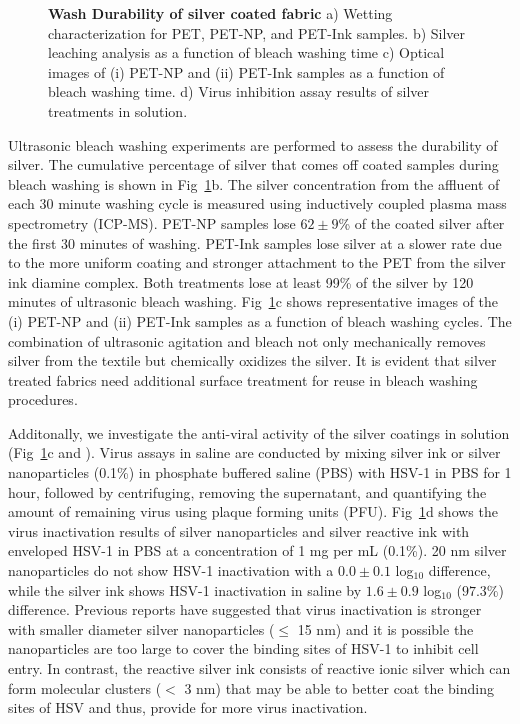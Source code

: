 \documentclass[10pt,letterpaper]{article}
\begin{document}
\begin{figure}[!h]
\caption{{\bf Wash Durability of silver coated fabric}{
a) Wetting characterization for PET, PET-NP, and PET-Ink samples. b) Silver leaching analysis as a function of bleach washing time c) Optical images of (i) PET-NP and (ii) PET-Ink samples as a function of bleach washing time. d) Virus inhibition assay results of silver treatments in solution.}}
\label{fig2}
\end{figure}

Ultrasonic bleach washing experiments are performed to assess the durability of silver.  
The cumulative percentage of silver that comes off coated samples during bleach washing is shown in 
Fig~\ref{fig2}b. The silver concentration from the affluent of each 30 minute washing cycle is measured using inductively coupled plasma mass spectrometry (ICP-MS). 
PET-NP samples lose $62 \pm 9$\% of the coated silver after the first 30 minutes of washing. 
PET-Ink samples lose silver at a slower rate due to the more uniform coating and stronger attachment to the PET from the silver ink diamine complex. 
Both treatments lose at least 99\% of the silver by 120 minutes of ultrasonic bleach washing. 
Fig~\ref{fig2}c shows representative images of the (i) PET-NP and (ii) PET-Ink samples as a function of bleach washing cycles.  
The combination of ultrasonic agitation and bleach not only mechanically removes silver from the textile but chemically oxidizes the silver.  
It is evident that silver treated fabrics need additional surface treatment for reuse in bleach washing procedures. 

Additonally, we investigate the anti-viral activity of the silver coatings in solution (Fig~\ref{fig2}c and ). 
Virus assays in saline are conducted by mixing silver ink or silver nanoparticles (0.1\%) in phosphate buffered saline (PBS) with HSV-1 in PBS for 1 hour, followed by centrifuging, removing the supernatant, and quantifying the amount of remaining virus using plaque forming units (PFU). 
Fig~\ref{fig2}d shows the virus inactivation results of silver nanoparticles and  silver reactive ink
with enveloped HSV-1 in PBS at a concentration of 1 mg per mL (0.1\%). 
20 nm silver nanoparticles do not show HSV-1 inactivation with a $0.0 \pm 0.1$ log$_{10}$ difference, while the silver ink shows HSV-1 inactivation in saline by $1.6 \pm 0.9$ log$_{10}$ ($97.3 %
\%$) difference. 
Previous reports have suggested that virus inactivation is stronger with smaller diameter silver nanoparticles ($\leq$ 15 nm) and it is possible the nanoparticles are too large to cover the binding sites of HSV-1 to inhibit cell entry.\cite{jeremiah_potent_2020}
In contrast, the reactive silver ink %
consists of reactive ionic silver which can form molecular clusters ($<$ 3 nm) that may be able to better coat the binding sites of HSV and thus, provide for more virus inactivation. 
\end{document}
